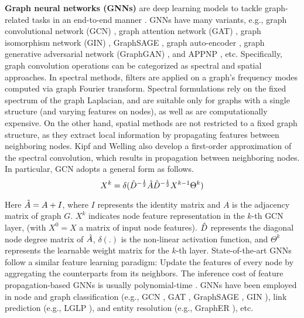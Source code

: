 \documentclass{sig-alternate-10pt}
\begin{document}
{\bf Graph neural networks (GNNs)} are deep learning models to tackle graph-related
tasks in an end-to-end manner \cite{WuPCLZY21}. GNNs have many variants, e.g.,
graph convolutional network (GCN) \cite{KipfW17}, graph attention network (GAT) \cite{VelickovicCCRLB18},
graph isomorphism network (GIN) \cite{XuHLJ19}, GraphSAGE \cite{HamiltonYL17}, graph auto-encoder \cite{KW16},
graph generative adversarial network (GraphGAN) \cite{WangWWZZZXG18}, and APPNP \cite{KlicperaBG19}, etc.
Specifically, graph convolution operations can be categorized as spectral \cite{BrunaZSL13}
and spatial \cite{DuvenaudMABHAA15}
approaches. In spectral methods, filters are applied on a graph's frequency modes computed via graph Fourier transform.
Spectral formulations rely on the fixed spectrum of the graph Laplacian, and are suitable only for graphs with a single
structure (and varying features on nodes), as well as are computationally expensive. On the other hand, spatial methods
are not restricted to a fixed graph structure, as they extract local information by propagating features between neighboring nodes.
Kipf and Welling \cite{KipfW17} also develop a first-order approximation of the spectral convolution, which results
in propagation between neighboring nodes. In particular, GCN
adopts a general form as follows.
\begin{equation}
\label{eq-prop}
    X^k = \delta(\Hat{D}^{-\frac{1}{2}} \Hat{A} \Hat{D}^{-\frac{1}{2}} X^{k-1}  \Theta^{k})
\end{equation}

Here $\Hat{A} = A + I$, where $I$ represents the identity matrix and $A$ is the adjacency matrix of graph $G$. $X^k$ indicates node feature representation in the $k$-th GCN layer, (with $X^0=X$ a matrix of input node features). $\Hat{D}$ represents the diagonal node degree matrix of $\Hat{A}$, $\delta(.)$ is the non-linear activation function, and $\Theta^{k}$ represents the learnable weight matrix for the $k$-th layer.
State-of-the-art GNNs follow a similar feature learning paradigm: Update the features of every node by aggregating the counterparts from its neighbors.
The inference cost of feature propagation-based GNNs is usually polynomial-time \cite{ChenWDL00W20,KlicperaBG19}.
GNNs have been employed in node and graph classification (e.g., GCN \cite{KipfW17}, GAT \cite{VelickovicCCRLB18},
GraphSAGE \cite{HamiltonYL17}, GIN \cite{XuHLJ19}), link prediction (e.g., LGLP \cite{CaiLWJ22}), and entity resolution
(e.g., GraphER \cite{Li0SZAW20}), etc.
\end{document}
